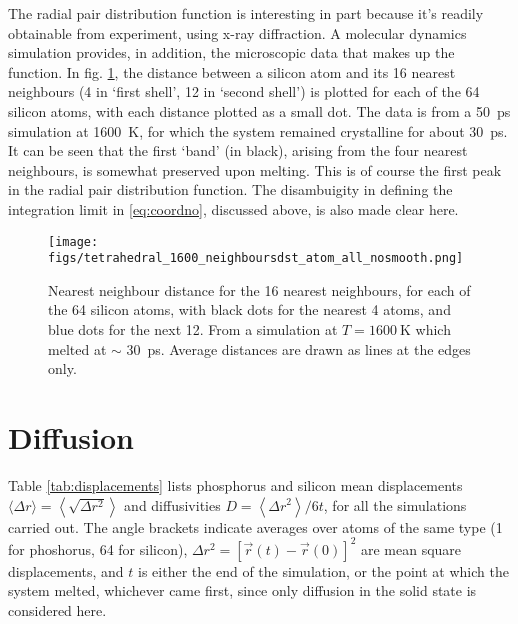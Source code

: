 \documentclass[11pt,bibliography=totoc,index=totoc]{scrbook}   %
\begin{document}
The radial pair distribution function is interesting in part because it's readily obtainable from experiment, using x-ray diffraction.
A molecular dynamics simulation provides, in addition, the microscopic data that makes up the function.
In fig. \ref{fig:nn_melting}, the distance between a silicon atom and its 16 nearest neighbours (4 in `first shell', 12 in `second shell') is plotted for each of the 64 silicon atoms, with each distance plotted as a small dot.
The data is from a 50~ps simulation at 1600~K, for which the system remained crystalline for about 30~ps.
It can be seen that the first `band' (in black), arising from the four nearest neighbours, is somewhat preserved upon melting. 
This is of course the first peak in the radial pair distribution function.
The disambuigity in defining the integration limit in \eqref{eq:coordno}, discussed above, is also made clear here.

\begin{figure}[htbp]
  \centering
  \texttt{[image: figs/tetrahedral\_1600\_neighboursdst\_atom\_all\_nosmooth.png]}
  \caption{Nearest neighbour distance for the 16 nearest neighbours, for each of the 64 silicon atoms,
      with black dots for the nearest 4 atoms, and blue dots for the next 12.
      From a simulation at $T=\SI{1600}{\kelvin}$ which melted at $\sim$ 30~ps.
      Average distances are drawn as lines at the edges only.
  }
  \label{fig:nn_melting}
\end{figure}

%
\section{Diffusion}\label{sec:diffusion-results}
%

Table \ref{tab:displacements} lists phosphorus and silicon mean displacements 
$\langle\Delta r\rangle = \left\langle\sqrt{\Delta r^2}\right\rangle$ 
and diffusivities 
$D = \left\langle\Delta r^2\right\rangle / 6t$, 
for all the simulations carried out.
The angle brackets indicate averages over atoms of the same type (1 for phoshorus, 64 for silicon), 
$\Delta r^2 = [\vec{r}(t) - \vec{r}(0)]^2$ are mean square displacements,
and $t$ is either the end of the simulation, or the point at which the system melted, whichever came first, 
since only diffusion in the solid state is considered here.
\end{document}
